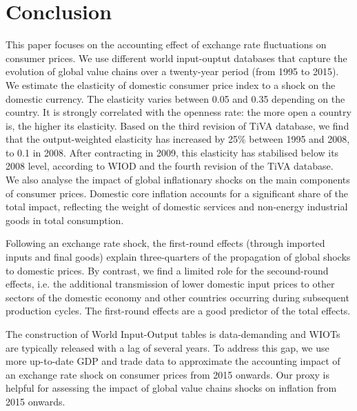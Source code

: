 \documentclass[11pt,a4paper]{article}
\begin{document}
\section{Conclusion}
\label{sec:ccl}

This paper focuses on the accounting effect of exchange rate fluctuations on consumer prices. 
We use different world input-ouptut databases that capture the evolution of global value chains over a twenty-year period (from 1995 to 2015).\\
We estimate the elasticity of domestic consumer price index to a shock on the domestic currency.
The elasticity varies between 0.05 and 0.35 depending on the country.
It is strongly correlated with the openness rate: the more open a country is, the higher its elasticity. 
Based on the third revision of TiVA database, we find that the output-weighted elasticity has increased by 25\% between 1995 and 2008, to 0.1 in 2008.
After contracting in 2009, this elasticity has stabilised below its 2008 level, according to WIOD and the fourth revision of the TiVA database.\\
We also analyse the impact of global inflationary shocks on the main components of consumer prices. 
Domestic core inflation accounts for a significant share of the total impact, reflecting the weight of domestic services and non-energy industrial goods in total consumption.

Following an exchange rate shock, the first-round effects (through imported inputs and final goods) explain three-quarters of the propagation of global shocks to domestic prices. 
By contrast, we find a limited role for the secound-round effects, i.e. the additional transmission of lower domestic input prices to other sectors of the domestic economy and other countries occurring during subsequent production cycles.
The first-round effects are a good predictor of the total effects.

The construction of World Input-Output tables is data-demanding and WIOTs are typically released with a lag of several years.
To address this gap, we use more up-to-date GDP and trade data to approximate the accounting impact of an exchange rate shock on consumer prices from 2015 onwards. 
Our proxy is helpful for assessing the impact of global value chains shocks on inflation from 2015 onwards.
\end{document}
